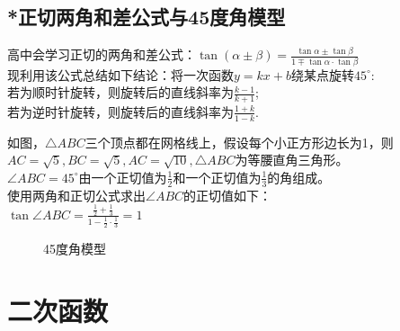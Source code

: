 \section{*正切两角和差公式与45度角模型}
\begin{theorem}
    高中会学习正切的两角和差公式：$\tan(\alpha\pm\beta)=\frac{\tan \alpha \pm \tan \beta}{1 \mp \tan \alpha·\tan \beta}$ \\
    现利用该公式总结如下结论：将一次函数$y=kx+b$绕某点旋转$45^\circ$: \\
    若为顺时针旋转，则旋转后的直线斜率为$\frac{k-1}{k+1}$; \\
    若为逆时针旋转，则旋转后的直线斜率为$\frac{1+k}{1-k}$.
\end{theorem}
\begin{theorem}
    如图，$\triangle ABC$三个顶点都在网格线上，假设每个小正方形边长为1，则$AC=\sqrt5,BC=\sqrt5,AC=\sqrt{10},\triangle ABC$为等腰直角三角形。\\
    $\angle ABC=45^\circ$由一个正切值为$\frac{1}{2}$和一个正切值为$\frac{1}{3}$的角组成。\\
    使用两角和正切公式求出$\angle ABC$的正切值如下：\\
    $\tan \angle ABC=\frac{\frac{1}{2}+\frac{1}{3}}{1-\frac{1}{2}·\frac{1}{3}}=1$ \\
\end{theorem}
\begin{figure}[H]
    \centering
    \resizebox{4cm}{!}{}
    \caption{45度角模型}
\end{figure}
\clearpage
\chapter{二次函数}
